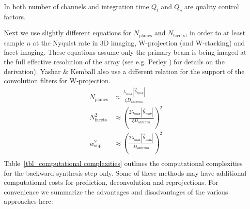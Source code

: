 In both number of channels and integration time $Q_t$ and $Q_c$ are quality control factors.

Next we use slightly different equations for $N_\text{planes}$ and $N_\text{facets}$, in order to at least sample $n$ at the Nyquist rate in 3D imaging, W-projection (and W-stacking) and facet imaging. 
These equations assume only the primary beam is being imaged at the full effective resolution of the array (see e.g. Perley \cite[Lecture 19]{taylor1999synthesis}) for details on the derivation). 
Yashar \& Kemball \cite{yashar2009tdp} also use a different relation for the support of the convolution filters for W-projection.
\begin{equation}
 \begin{split}
  N_\text{planes} &\approx \frac{\lambda_{\text{max}}|\vec{b}_{\text{max}}|}{\xi D_{\text{antenna}}}\\
  N_\text{facets}^2 &\approx \left(\frac{2\lambda_{\text{max}}|\vec{b}_{\text{max}}|}{\xi D_{\text{antenna}}}\right)^2\\
  w_\text{sup}^2 &\approx \left(\frac{2\lambda_{\text{max}}|\vec{b}_{\text{max}}|}{D_{\text{antenna}}}\right)^2\\
 \end{split}
\end{equation}
Table~\ref{tbl_computational complexities} outlines the computational complexities for the backward synthesis step only. Some of these methods may have additional computational costs for prediction, deconvolution and reprojections.
For convenience we summarize the advantages and disadvantages of the various approaches here: 
